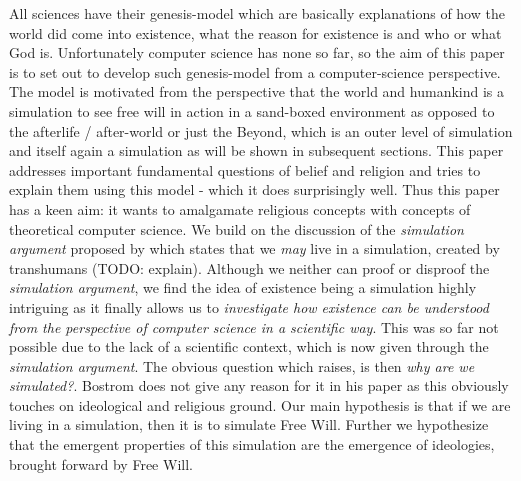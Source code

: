 All sciences have their genesis-model which are basically explanations of how the world did come into existence, what the reason for existence is and who or what God is. Unfortunately computer science has none so far, so the aim of this paper is to set out to develop such genesis-model from a computer-science perspective. The model is motivated from the perspective that the world and humankind is a simulation to see free will in action in a sand-boxed environment as opposed to the afterlife / after-world or just the Beyond, which is an outer level of simulation and itself again a simulation as will be shown in subsequent sections.
This paper addresses important fundamental questions of belief and religion and tries to explain them using this model - which it does surprisingly well. Thus this paper has a keen aim: it wants to amalgamate religious concepts with concepts of theoretical computer science.
We build on the discussion of the \textit{simulation argument} proposed by \cite{bostrom_are_2003} which states that we \textit{may} live in a simulation, created by transhumans (TODO: explain). Although we neither can proof or disproof the \textit{simulation argument}, we find the idea of existence being a simulation highly intriguing as it finally allows us to \textit{investigate how existence can be understood from the perspective of computer science in a scientific way}. This was so far not possible due to the lack of a scientific context, which is now given through the \textit{simulation argument}. The obvious question which raises, is then \textit{why are we simulated?}. Bostrom does not give any reason for it in his paper as this obviously touches on ideological and religious ground. Our main hypothesis is that if we are living in a simulation, then it is to simulate Free Will. Further we hypothesize that the emergent properties of this simulation are the emergence of ideologies, brought forward by Free Will.
